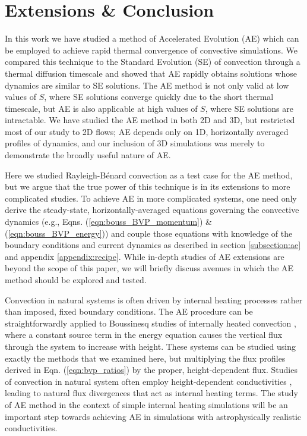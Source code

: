 \documentclass[aps, pre, onecolumn, nofootinbib, notitlepage, groupedaddress, amsfonts, amssymb, amsmath, longbibliography]{revtex4-1}
\newcommand{\RB}{Rayleigh-B\'{e}nard }
\begin{document}


\section{Extensions \& Conclusion}
\label{sec:extensions}
In this work we have studied a method of Accelerated Evolution (AE) which can
be employed to achieve rapid thermal convergence of convective simulations.  We compared
this technique to the Standard Evolution (SE) of convection through a thermal diffusion timescale and
showed that AE rapidly obtains solutions whose dynamics are similar to SE solutions.
The AE method is not only valid at low values of $S$, where SE solutions
converge quickly due to the short thermal timescale, but AE is also applicable
at high values of $S$, where SE solutions are intractable.
We have studied
the AE method in both 2D and 3D, but restricted most of our study to 2D flows;
AE depends only on 1D, horizontally averaged profiles of dynamics, and our inclusion of 3D
simulations was merely to demonstrate the broadly useful nature of AE.

Here we studied \RB convection as a test case for the AE method, but we argue that
the true power of this technique is in its extensions to more complicated studies.
To achieve AE in more complicated systems, one need only derive 
the steady-state, horizontally-averaged equations governing
the convective dynamics
(e.g., Eqns. (\ref{eqn:bouss_BVP_momentum}) \& (\ref{eqn:bouss_BVP_energy}))
and couple those equations with knowledge of the boundary conditions
and current dynamics as described in
section \ref{subsection:ae} and appendix \ref{appendix:recipe}.
While in-depth studies of AE extensions are beyond the 
scope of this paper, we will briefly discuss
avenues in which the AE method should be explored and tested.

Convection in natural systems is often driven by internal heating processes
rather than imposed, fixed boundary conditions. The AE procedure can be straightforwardly
applied to Boussinesq studies of internally heated convection \cite{goluskin2016},
where a constant source term in the energy equation causes 
the vertical flux through the system to increase with height.
These systems can be
studied using exactly the methods that we examined here, but 
multiplying the flux profiles derived
in Eqn. (\ref{eqn:bvp_ratios}) by the proper, height-dependent flux. Studies of
convection in natural system often employ height-dependent conductivities
\cite{brandenburg2016, kapyla&all2017}, leading
to natural flux divergences that act as internal heating terms.
The study
of AE method in the context of simple internal heating simulations will be an important step
towards achieving AE in simulations with astrophysically realistic conductivities.
\end{document}
